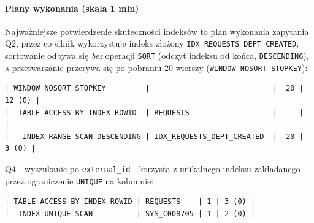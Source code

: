 \documentclass[12pt,a4paper]{article}
\begin{document}
\paragraph{Plany wykonania (skala 1 mln)}
Najważniejsze potwierdzenie skuteczności indeksów to plan wykonania
zapytania Q2, przez co silnik wykorzystuje indeks złożony
\texttt{IDX\_REQUESTS\_DEPT\_CREATED}, sortowanie odbywa się \emph{bez}
operacji \texttt{SORT} (odczyt indeksu od końca, \texttt{DESCENDING}),
a przetwarzanie przerywa się po pobraniu 20 wierszy
(\texttt{WINDOW NOSORT STOPKEY}):

\begin{lstlisting}[language={}, caption={Plan wykonania Q2 dla 1 mln wierszy}]
| WINDOW NOSORT STOPKEY         |                            |  20 | 12 (0) |
|  TABLE ACCESS BY INDEX ROWID  | REQUESTS                   |     |        |
|   INDEX RANGE SCAN DESCENDING | IDX_REQUESTS_DEPT_CREATED  |  20 |  3 (0) |
\end{lstlisting}

Q4 - wyszukanie po \texttt{external\_id} - korzysta z unikalnego
indeksu zakładanego przez ograniczenie \texttt{UNIQUE} na kolumnie:

\begin{lstlisting}[language={}, caption={Plan wykonania Q4 dla 1 mln wierszy}]
| TABLE ACCESS BY INDEX ROWID | REQUESTS    | 1 | 3 (0) |
|  INDEX UNIQUE SCAN          | SYS_C008705 | 1 | 2 (0) |
\end{lstlisting}
\end{document}
